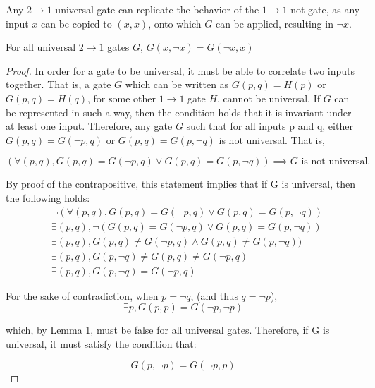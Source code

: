 \documentclass[12pt]{article}
\begin{document}
\begin{corrolary}
    Any $2 \to 1$ universal gate can replicate the behavior of the $1 \to 1$ not gate, as any input $x$ can be copied to $(x, x)$, onto which $G$ can be applied, resulting in $\neg x$.
\end{corrolary}

\begin{lemma}
    For all universal $2 \to 1$ gates $G$,
    $G(x, \neg x) = G(\neg x, x)$
\end{lemma}

\begin{proof}
	In order for a gate to be universal, it must be able to correlate two inputs together. That is, a gate $G$ which can be written as $G(p, q) = H(p)$ or $G(p, q) = H(q)$, for some other $1 \to 1$ gate $H$, cannot be universal. If $G$ can be represented in such a way, then the condition holds that it is invariant under at least one input. Therefore, any gate $G$ such that for all inputs p and q, either $G(p, q) = G(\neg p, q)$ or $G(p, q) = G(p, \neg q)$ is not universal. That is,

    $$(\forall (p, q), G(p, q) = G(\neg p, q) \lor G(p, q) = G(p, \neg q)) \implies G \text{ is not universal.}$$

    By proof of the contrapositive, this statement implies that if G is universal, then the following holds:
    \begin{align}
        &\neg (\forall (p, q), G(p, q) = G(\neg p, q) \lor G(p, q) = G(p, \neg q)) \\
        &\exists (p, q), \neg (G(p, q) = G(\neg p, q) \lor G(p, q) = G(p, \neg q)) \\
        &\exists (p, q), G(p, q) \ne G(\neg p, q) \land G(p, q) \ne G(p, \neg q)) \\
        &\exists (p, q), G(p, \neg q) \ne G(p, q) \ne G(\neg p, q) \\
        &\exists (p, q), G(p, \neg q) = G(\neg p, q)
    \end{align}

    For the sake of contradiction, when $p = \neg q$, (and thus $q = \neg p$),
    $$\exists p, G(p, p) = G(\neg p, \neg p)$$

    which, by Lemma 1, must be false for all universal gates. Therefore, if G is universal, it must satisfy the condition that:

    $$G(p, \neg p) = G(\neg p, p)$$
\end{proof}
\end{document}
